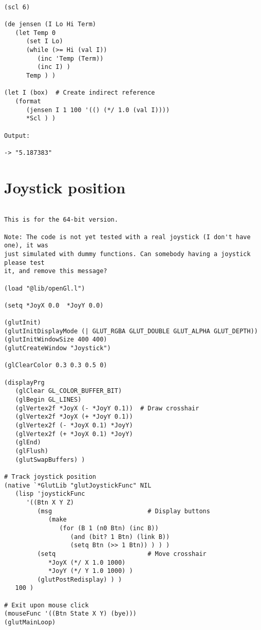 \begin{verbatim}

(scl 6)

(de jensen (I Lo Hi Term)
   (let Temp 0
      (set I Lo)
      (while (>= Hi (val I))
         (inc 'Temp (Term))
         (inc I) )
      Temp ) )

(let I (box)  # Create indirect reference
   (format
      (jensen I 1 100 '(() (*/ 1.0 (val I))))
      *Scl ) )

Output:

-> "5.187383"

\end{verbatim}

\section*{Joystick position}

\begin{verbatim}

This is for the 64-bit version.

Note: The code is not yet tested with a real joystick (I don't have one), it was
just simulated with dummy functions. Can somebody having a joystick please test
it, and remove this message?

(load "@lib/openGl.l")

(setq *JoyX 0.0  *JoyY 0.0)

(glutInit)
(glutInitDisplayMode (| GLUT_RGBA GLUT_DOUBLE GLUT_ALPHA GLUT_DEPTH))
(glutInitWindowSize 400 400)
(glutCreateWindow "Joystick")

(glClearColor 0.3 0.3 0.5 0)

(displayPrg
   (glClear GL_COLOR_BUFFER_BIT)
   (glBegin GL_LINES)
   (glVertex2f *JoyX (- *JoyY 0.1))  # Draw crosshair
   (glVertex2f *JoyX (+ *JoyY 0.1))
   (glVertex2f (- *JoyX 0.1) *JoyY)
   (glVertex2f (+ *JoyX 0.1) *JoyY)
   (glEnd)
   (glFlush)
   (glutSwapBuffers) )

# Track joystick position
(native `*GlutLib "glutJoystickFunc" NIL
   (lisp 'joystickFunc
      '((Btn X Y Z)
         (msg                          # Display buttons
            (make
               (for (B 1 (n0 Btn) (inc B))
                  (and (bit? 1 Btn) (link B))
                  (setq Btn (>> 1 Btn)) ) ) )
         (setq                         # Move crosshair
            *JoyX (*/ X 1.0 1000)
            *JoyY (*/ Y 1.0 1000) )
         (glutPostRedisplay) ) )
   100 )

# Exit upon mouse click
(mouseFunc '((Btn State X Y) (bye)))
(glutMainLoop)

\end{verbatim}

